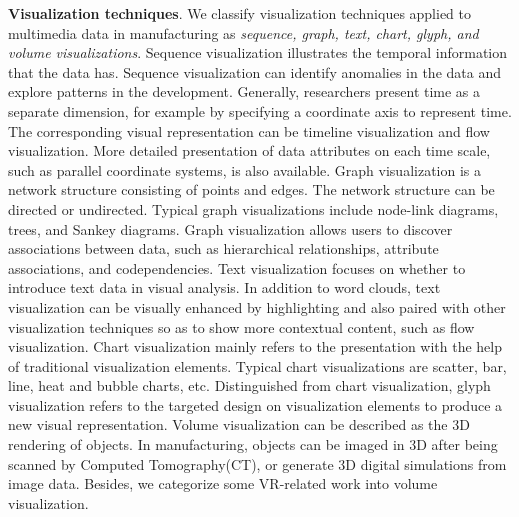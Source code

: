 \documentclass[a4paper,fleqn]{cas-dc}
\begin{document}
\textbf{Visualization techniques}. We classify visualization techniques applied to multimedia data in manufacturing as \textit{sequence, graph, text, chart, glyph, and volume visualizations}. 
Sequence visualization illustrates the temporal information that the data has. Sequence visualization can identify anomalies in the data and explore patterns in the development. Generally, researchers present time as a separate dimension, for example by specifying a coordinate axis to represent time. The corresponding visual representation can be timeline visualization and flow visualization. More detailed presentation of data attributes on each time scale, such as parallel coordinate systems, is also available.
Graph visualization is a network structure consisting of points and edges. The network structure can be directed or undirected. Typical  graph visualizations include node-link diagrams, trees, and Sankey diagrams. Graph visualization allows users to discover associations between data, such as hierarchical relationships, attribute associations, and codependencies.
Text visualization focuses on whether to introduce text data in visual analysis. In addition to word clouds, text visualization can be visually enhanced by highlighting and also paired with other visualization techniques so as to show more contextual content, such as flow visualization.
Chart visualization mainly refers to the presentation with the help of traditional visualization elements. Typical chart visualizations are scatter, bar, line, heat and bubble charts, etc.
Distinguished from chart visualization, glyph visualization refers to the targeted design on visualization elements to produce a new visual representation.
Volume visualization can be described as the 3D rendering of objects. In manufacturing, objects can be imaged in 3D after being scanned by Computed Tomography(CT), or generate 3D digital simulations from image data. Besides, we categorize some VR-related work into volume visualization.
\end{document}
